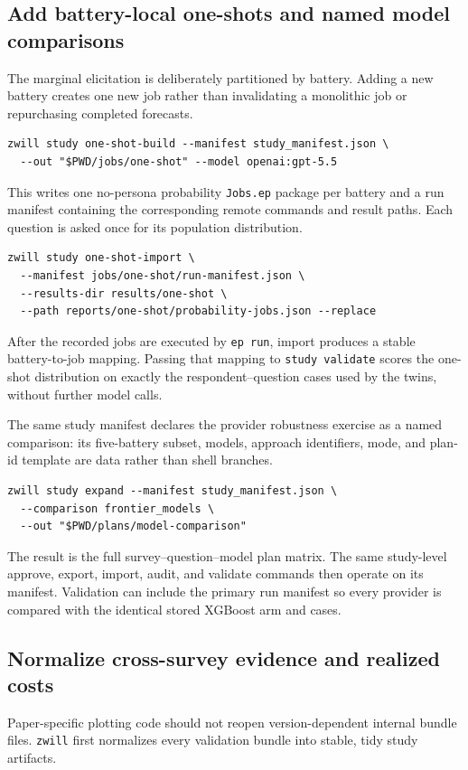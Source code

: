 \documentclass[11pt]{article}
\newcommand{\zwill}{\texttt{zwill}}
\begin{document}
\subsection{Add battery-local one-shots and named model comparisons}
The marginal elicitation is deliberately partitioned by battery. Adding a new
battery creates one new job rather than invalidating a monolithic job or
repurchasing completed forecasts.

\begin{lstlisting}[style=shell]
zwill study one-shot-build --manifest study_manifest.json \
  --out "$PWD/jobs/one-shot" --model openai:gpt-5.5
\end{lstlisting}
This writes one no-persona probability \texttt{Jobs.ep} package per battery and
a run manifest containing the corresponding remote commands and result paths.
Each question is asked once for its population distribution.

\begin{lstlisting}[style=shell]
zwill study one-shot-import \
  --manifest jobs/one-shot/run-manifest.json \
  --results-dir results/one-shot \
  --path reports/one-shot/probability-jobs.json --replace
\end{lstlisting}
After the recorded jobs are executed by \texttt{ep run}, import produces a
stable battery-to-job mapping. Passing that mapping to \texttt{study validate}
scores the one-shot distribution on exactly the respondent--question cases used
by the twins, without further model calls.

The same study manifest declares the provider robustness exercise as a named
comparison: its five-battery subset, models, approach identifiers, mode, and
plan-id template are data rather than shell branches.

\begin{lstlisting}[style=shell]
zwill study expand --manifest study_manifest.json \
  --comparison frontier_models \
  --out "$PWD/plans/model-comparison"
\end{lstlisting}
The result is the full survey--question--model plan matrix. The same study-level
approve, export, import, audit, and validate commands then operate on its
manifest. Validation can include the primary run manifest so every provider is
compared with the identical stored XGBoost arm and cases.

\subsection{Normalize cross-survey evidence and realized costs}
Paper-specific plotting code should not reopen version-dependent internal
bundle files. \zwill{} first normalizes every validation bundle into stable,
tidy study artifacts.
\end{document}
